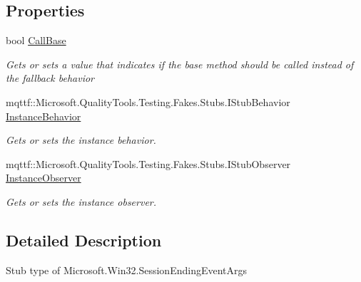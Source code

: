 \subsection*{Properties}
\begin{DoxyCompactItemize}
\item 
bool \hyperlink{class_microsoft_1_1_win32_1_1_fakes_1_1_stub_session_ending_event_args_a8fabb923d9dff283d6e8f5605dadbad1}{Call\-Base}
\begin{DoxyCompactList}\small\item\em Gets or sets a value that indicates if the base method should be called instead of the fallback behavior\end{DoxyCompactList}\item 
mqttf\-::\-Microsoft.\-Quality\-Tools.\-Testing.\-Fakes.\-Stubs.\-I\-Stub\-Behavior \hyperlink{class_microsoft_1_1_win32_1_1_fakes_1_1_stub_session_ending_event_args_a9c62d46f6d2a8039397aa6a7a4635aab}{Instance\-Behavior}
\begin{DoxyCompactList}\small\item\em Gets or sets the instance behavior.\end{DoxyCompactList}\item 
mqttf\-::\-Microsoft.\-Quality\-Tools.\-Testing.\-Fakes.\-Stubs.\-I\-Stub\-Observer \hyperlink{class_microsoft_1_1_win32_1_1_fakes_1_1_stub_session_ending_event_args_ababa10f8917838289be2dd165ff7caa2}{Instance\-Observer}
\begin{DoxyCompactList}\small\item\em Gets or sets the instance observer.\end{DoxyCompactList}\end{DoxyCompactItemize}


\subsection{Detailed Description}
Stub type of Microsoft.\-Win32.\-Session\-Ending\-Event\-Args



